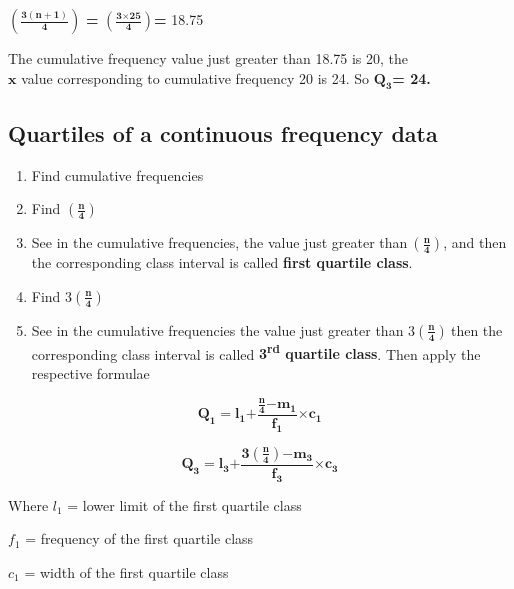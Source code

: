\documentclass[
]{book}
\begin{document}
\(\left( \frac{\mathbf{3(n + 1)}}{\mathbf{4}} \right)\) \textbf{=}
\(\left( \frac{\mathbf{3}\mathbf{\times}\mathbf{25}}{\mathbf{4}} \right)\)\textbf{=}
18.75

The cumulative frequency value just greater than 18.75 is 20, the\\
\(\mathbf{x}\) value corresponding to cumulative frequency 20 is 24. So
\(\mathbf{Q}_{\mathbf{3}}\)\textbf{= 24.}

\hypertarget{quartiles-of-a-continuous-frequency-data}{%
\subsection{Quartiles of a continuous frequency data}\label{quartiles-of-a-continuous-frequency-data}}

\begin{enumerate}
\def\labelenumi{\arabic{enumi}.}
\item
  Find cumulative frequencies
\item
  Find \(\left( \frac{\mathbf{n}}{\mathbf{4}} \right)\)
\item
  See in the cumulative frequencies, the value just greater
  than\(\ \left( \frac{\mathbf{n}}{\mathbf{4}} \right)\), and then the
  corresponding class interval is called \textbf{first quartile class}.
\item
  Find \(3\left( \frac{\mathbf{n}}{\mathbf{4}} \right)\)
\item
  See in the cumulative frequencies the value just greater than
  \(3\left( \frac{\mathbf{n}}{\mathbf{4}} \right)\mathbf{\ }\)then the
  corresponding class interval is called \textbf{3\textsuperscript{rd} quartile class}.
  Then apply the respective formulae
\end{enumerate}

\[\mathbf{Q}_{\mathbf{1}}\mathbf{=}\mathbf{l}_{\mathbf{1}}\mathbf{+}\frac{\frac{\mathbf{n}}{\mathbf{4}}\mathbf{-}\mathbf{m}_{\mathbf{1}}}{\mathbf{f}_{\mathbf{1}}}\mathbf{\times}\mathbf{c}_{\mathbf{1}}\]

\[\mathbf{Q}_{\mathbf{3}}\mathbf{=}\mathbf{l}_{\mathbf{3}}\mathbf{+}\frac{\mathbf{3}\left( \frac{\mathbf{n}}{\mathbf{4}} \right)\mathbf{-}\mathbf{m}_{\mathbf{3}}}{\mathbf{f}_{\mathbf{3}}}\mathbf{\times}\mathbf{c}_{\mathbf{3}}\]

Where \(l_{1}\) = lower limit of the first quartile class

\(f_{1}\) = frequency of the first quartile class

\(c_{1}\) = width of the first quartile class
\end{document}
